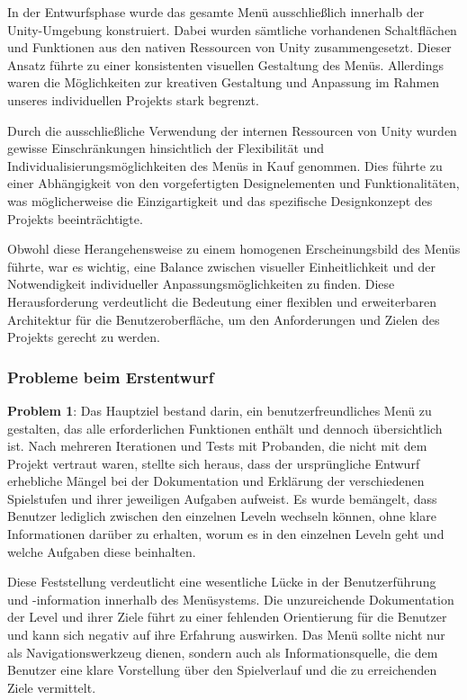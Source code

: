 In der Entwurfsphase wurde das gesamte Menü ausschließlich innerhalb der Unity-Umgebung konstruiert. Dabei wurden
sämtliche vorhandenen Schaltflächen und Funktionen aus den nativen Ressourcen von Unity zusammengesetzt. Dieser Ansatz
führte zu einer konsistenten visuellen Gestaltung des Menüs. Allerdings waren die Möglichkeiten zur kreativen Gestaltung
und Anpassung im Rahmen unseres individuellen Projekts stark begrenzt.

Durch die ausschließliche Verwendung der internen Ressourcen von Unity wurden gewisse Einschränkungen hinsichtlich der
Flexibilität und Individualisierungsmöglichkeiten des Menüs in Kauf genommen. Dies führte zu einer Abhängigkeit von den
vorgefertigten Designelementen und Funktionalitäten, was möglicherweise die Einzigartigkeit und das spezifische
Designkonzept des Projekts beeinträchtigte.

Obwohl diese Herangehensweise zu einem homogenen Erscheinungsbild des Menüs führte, war es wichtig, eine Balance zwischen
visueller Einheitlichkeit und der Notwendigkeit individueller Anpassungsmöglichkeiten zu finden. Diese Herausforderung
verdeutlicht die Bedeutung einer flexiblen und erweiterbaren Architektur für die Benutzeroberfläche, um den Anforderungen
und Zielen des Projekts gerecht zu werden.

\subsubsection{Probleme beim Erstentwurf}
\textbf{Problem 1}: Das Hauptziel bestand darin, ein benutzerfreundliches Menü zu gestalten, das alle erforderlichen
Funktionen enthält und dennoch übersichtlich ist. Nach mehreren Iterationen und Tests mit Probanden, die nicht mit dem
Projekt vertraut waren, stellte sich heraus, dass der ursprüngliche Entwurf erhebliche Mängel bei der Dokumentation und
Erklärung der verschiedenen Spielstufen und ihrer jeweiligen Aufgaben aufweist. Es wurde bemängelt, dass Benutzer lediglich
zwischen den einzelnen Leveln wechseln können, ohne klare Informationen darüber zu erhalten, worum es in den einzelnen
Leveln geht und welche Aufgaben diese beinhalten.

Diese Feststellung verdeutlicht eine wesentliche Lücke in der Benutzerführung und -information innerhalb des Menüsystems.
Die unzureichende Dokumentation der Level und ihrer Ziele führt zu einer fehlenden Orientierung für die Benutzer und kann
sich negativ auf ihre Erfahrung auswirken. Das Menü sollte nicht nur als Navigationswerkzeug dienen, sondern auch als
Informationsquelle, die dem Benutzer eine klare Vorstellung über den Spielverlauf und die zu erreichenden Ziele vermittelt.

